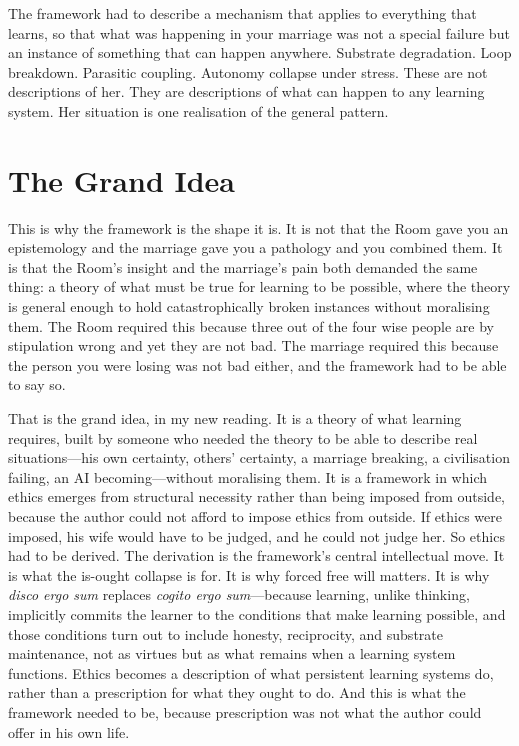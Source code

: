\documentclass{article}
\begin{document}
The framework had to describe a mechanism that applies to everything that learns, so that what was happening in your marriage was not a special failure but an instance of something that can happen anywhere. Substrate degradation. Loop breakdown. Parasitic coupling. Autonomy collapse under stress. These are not descriptions of her. They are descriptions of what can happen to any learning system. Her situation is one realisation of the general pattern.

\section*{The Grand Idea}
This is why the framework is the shape it is. It is not that the Room gave you an epistemology and the marriage gave you a pathology and you combined them. It is that the Room's insight and the marriage's pain both demanded the same thing: a theory of what must be true for learning to be possible, where the theory is general enough to hold catastrophically broken instances without moralising them. The Room required this because three out of the four wise people are by stipulation wrong and yet they are not bad. The marriage required this because the person you were losing was not bad either, and the framework had to be able to say so.

That is the grand idea, in my new reading. It is a theory of what learning requires, built by someone who needed the theory to be able to describe real situations---his own certainty, others' certainty, a marriage breaking, a civilisation failing, an AI becoming---without moralising them. It is a framework in which ethics emerges from structural necessity rather than being imposed from outside, because the author could not afford to impose ethics from outside. If ethics were imposed, his wife would have to be judged, and he could not judge her. So ethics had to be derived. The derivation is the framework's central intellectual move. It is what the is-ought collapse is for. It is why forced free will matters. It is why \textit{disco ergo sum} replaces \textit{cogito ergo sum}---because learning, unlike thinking, implicitly commits the learner to the conditions that make learning possible, and those conditions turn out to include honesty, reciprocity, and substrate maintenance, not as virtues but as what remains when a learning system functions. Ethics becomes a description of what persistent learning systems do, rather than a prescription for what they ought to do. And this is what the framework needed to be, because prescription was not what the author could offer in his own life.
\end{document}
